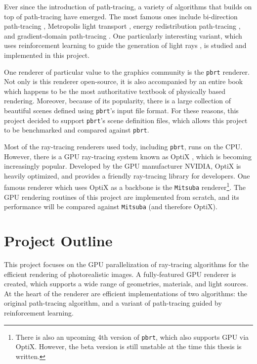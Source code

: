 Ever since the introduction of path-tracing, a variety of algorithms that builds on top of path-tracing have emerged. The most famous ones include bi-direction path-tracing \cite{veach1997robust}, Metropolis light transport \cite{veach1997robust,kelemen2002simple}, energy redistribution path-tracing \cite{cline2005energy}, and gradient-domain path-tracing \cite{kettunen2015gradient}. One particularly interesting variant, which uses reinforcement learning to guide the generation of light rays \cite{RLPT}, is studied and implemented in this project. 

One renderer of particular value to the graphics community is the \texttt{pbrt} renderer. Not only is this renderer open-source, it is also accompanied by an entire book \cite{pharr2016physically} which happens to be the most authoritative textbook of physically based rendering. Moreover, because of its popularity, there is a large collection of beautiful scenes defined using \texttt{pbrt}'s input file format. For these reasons, this project decided to support \texttt{pbrt}'s scene definition files, which allows this project to be benchmarked and compared against \texttt{pbrt}.

Most of the ray-tracing renderers used tody, including \texttt{pbrt}, runs on the CPU. However, there is a GPU ray-tracing system known as OptiX \cite{parker2010optix}, which is becoming increasingly popular. Developed by the GPU manufacturer NVIDIA, OptiX is heavily optimized, and provides a friendly ray-tracing library for developers. One famous renderer which uses OptiX as a backbone is the \texttt{Mitsuba} renderer\footnote{There is also an upcoming 4th version of \texttt{pbrt}, which also supports GPU via OptiX. However, the beta version is still unstable at the time this thesis is written.}. The GPU rendering routines of this project are implemented from scratch, and its performance will be compared against \texttt{Mitsuba} (and therefore OptiX).

\section{Project Outline}
This project focuses on the GPU parallelization of ray-tracing algorithms for the efficient rendering of photorealistic images. A fully-featured GPU renderer is created, which supports a wide range of geometries, materials, and light sources. At the heart of the renderer are efficient implementations of two algorithms: the original path-tracing algorithm, and a variant of path-tracing guided by reinforcement learning. 

